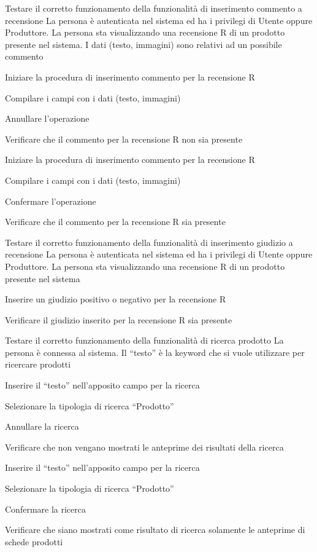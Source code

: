 {Testare il corretto funzionamento della funzionalità di inserimento commento a recensione}
{La persona è autenticata nel sistema ed ha i privilegi di Utente oppure Produttore. La persona sta visualizzando una recensione R di un prodotto presente nel sistema. I dati (testo, immagini) sono relativi ad un possibile commento}
{\begin{enumCU}
	\item Iniziare la procedura di inserimento commento per la recensione R
	\item Compilare i campi con i dati (testo, immagini)
	\item Annullare l'operazione 
	\item Verificare che il commento per la recensione R non sia presente
	\item Iniziare la procedura di inserimento commento per la recensione R
	\item Compilare i campi con i dati (testo, immagini)
	\item Confermare l'operazione 
	\item Verificare che il commento per la recensione R sia presente
\end{enumCU}}


{Testare il corretto funzionamento della funzionalità di inserimento giudizio a recensione}
{La persona è autenticata nel sistema ed ha i privilegi di Utente oppure Produttore. La persona sta visualizzando una recensione R di un prodotto presente nel sistema}
{\begin{enumCU}
	\item Inserire un giudizio positivo o negativo per la recensione R
	\item Verificare il giudizio inserito per la recensione R sia presente
\end{enumCU}}


{Testare il corretto funzionamento della funzionalità di ricerca prodotto}
{La persona è connessa al sistema. Il ``testo'' è la keyword che si vuole utilizzare per ricercare prodotti}
{\begin{enumCU}
	\item Inserire il ``testo'' nell'apposito campo per la ricerca
	\item Selezionare la tipologia di ricerca ``Prodotto''
	\item Annullare la ricerca
	\item Verificare che non vengano mostrati le anteprime dei risultati della ricerca
	\item Inserire il ``testo'' nell'apposito campo per la ricerca
	\item Selezionare la tipologia di ricerca ``Prodotto''
	\item Confermare la ricerca
	\item Verificare che siano mostrati come risultato di ricerca solamente le anteprime di schede prodotti
\end{enumCU}}

